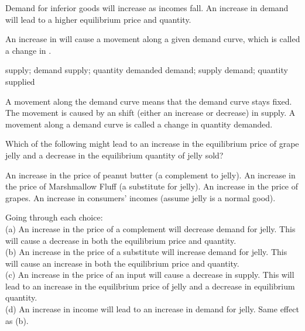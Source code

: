 \documentclass[addpoints,11pt]{exam}
\theoremstyle{definition}
\newcommand{\blank}[0]{\underline{\hspace{3cm}}}
\begin{document}
\begin{questions}
\begin{solution}
	Demand for inferior goods will increase as incomes fall. An increase in demand will lead to a higher equilibrium price and quantity.
\end{solution}

\newpage

\question An increase in \blank will cause a movement along a given demand curve, which is called a change in \blank.

\begin{choices}
	\choice supply; demand
	\CorrectChoice supply; quantity demanded
	\choice demand; supply
	\choice demand; quantity supplied
\end{choices}

\begin{solution}
	A movement along the demand curve means that the demand curve stays fixed. The movement is caused by an shift (either an increase or decrease) in supply. A movement along a demand curve is called a change in quantity demanded.
\end{solution}

\question Which of the following might lead to an increase in the equilibrium price of grape jelly and a decrease in the equilibrium quantity of jelly sold?

\begin{choices}
	\choice An increase in the price of peanut butter (a complement to jelly).
	\choice An increase in the price of Marshmallow Fluff (a substitute for jelly).
	\CorrectChoice An increase in the price of grapes.
	\choice An increase in consumers' incomes (assume jelly is a normal good).
\end{choices}

\begin{solution}
	Going through each choice: \\
	(a) An increase in the price of a complement will decrease demand for jelly. This will cause a decrease in both the equilibrium price and quantity. \\
	(b) An increase in the price of a substitute will increase demand for jelly. This will cause an increase in both the equilibrium price and quantity. \\
	(c) An increase in the price of an input will cause a decrease in supply. This will lead to an increase in the equilibrium price of jelly and a decrease in equilibrium quantity. \\
	(d) An increase in income will lead to an increase in demand for jelly. Same effect as (b).
\end{solution}


\end{questions}
\end{document}
